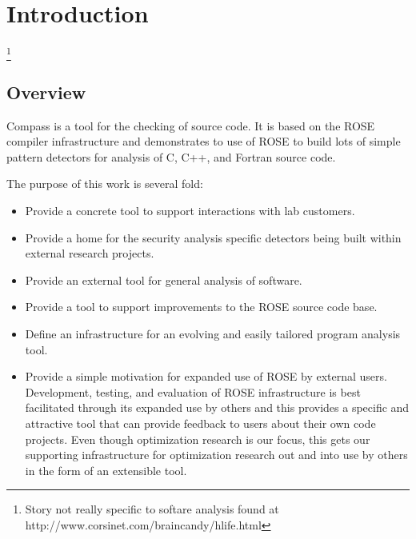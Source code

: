 \chapter{Introduction}

\footnote{Story not really specific to softare analysis found at
 http://www.corsinet.com/braincandy/hlife.html}


\section{Overview}

\label{introduction::overview}

   Compass is a tool for the checking of source code.  It is
based on the ROSE compiler infrastructure and demonstrates to
use of ROSE to build lots of simple pattern detectors for analysis
of C, C++, and Fortran source code.

   The purpose of this work is several fold:
\begin{itemize}
   \item Provide a concrete tool to support interactions with lab customers.
   \item Provide a home for the security analysis specific detectors being built within
         external research projects.
   \item Provide an external tool for general analysis of software.
   \item Provide a tool to support improvements to the ROSE source code base.
   \item Define an infrastructure for an evolving and easily tailored program analysis tool.
   \item Provide a simple motivation for expanded use of ROSE by external users.
         Development, testing, and evaluation of ROSE infrastructure is best facilitated 
         through its expanded use by others and this provides a specific and attractive
         tool that can provide feedback to users about their own code projects.  Even
         though optimization research is our focus, this gets our supporting
         infrastructure for optimization research out and into use by others in the form
         of an extensible tool.
\end{itemize}

